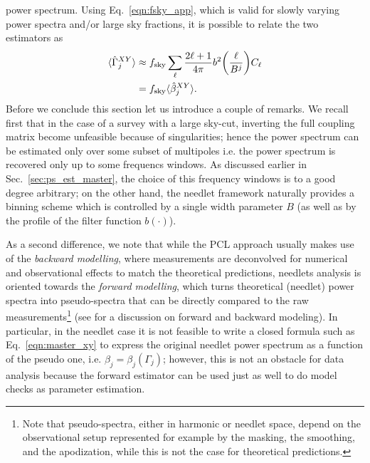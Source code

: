 power spectrum. Using Eq.~\eqref{eqn:fsky_app}, which is valid for slowly varying power spectra and/or large sky fractions,
it is possible to relate the two estimators as 
%
\begin{equation}
\label{eqn:gammabeta}
\begin{split}
\langle \hat{\Gamma}^{XY}_j \rangle &\approx  f_{\rm{sky}}\sum_{\ell} \frac{2\ell+1}{{4\pi}} b^2\biggl(\frac{\ell}{B^{j}}\biggr) C_{\ell}\\
&= f_{\rm{sky}} \langle \hat{\beta}^{XY}_j \rangle.
\end{split}
\end{equation}
%
Before we conclude this section let us introduce a couple of remarks. We recall first that in the case of a survey with a large sky-cut, inverting the full coupling matrix become unfeasible because of singularities; hence the power spectrum can be estimated  only over some subset of multipoles i.e. the power spectrum is recovered only up to some frequencs windows.
As discussed earlier in Sec.~\eqref{sec:ps_est_master}, the choice of this frequency windows is to a good degree arbitrary; on the other hand, the needlet framework naturally provides a binning 
scheme which is  controlled by a single width parameter $B$ (as well as by the profile of the filter function $b(\cdot)$).

As a second difference, we note that while the  PCL approach  usually
makes use of the \emph{backward modelling}, where measurements are deconvolved for numerical and observational 
effects to match the theoretical predictions, needlets analysis is oriented towards the 
\emph{forward modelling}, which turns theoretical (needlet) power spectra into pseudo-spectra that can be directly compared to the raw 
measurements\footnote{Note that pseudo-spectra, either in harmonic or needlet space, depend on the observational setup represented
for example by the masking, the smoothing, and the apodization, while this is not the case for theoretical predictions.} (see \cite{Harnois-Deraps2016} 
for a  discussion on forward and backward modeling). 
In particular, in the needlet case it is not feasible to write a closed formula such as Eq.~\eqref{eqn:master_xy} to express the original needlet power spectrum as a function of the pseudo one, i.e. $\beta_j = \beta_j(\Gamma_j)$; however, this is not an obstacle for data analysis because the forward estimator can be used just as well to do model checks as parameter estimation.

